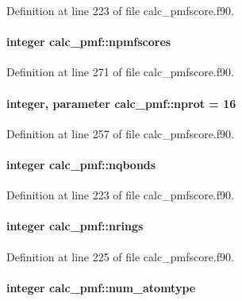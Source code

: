 Definition at line 223 of file calc\-\_\-pmfscore.\-f90.

\hypertarget{classcalc__pmf_ab503cd9dec507e951441afa3c867d4f9}{
\paragraph[{npmfscores}]{\setlength{\rightskip}{0pt plus 5cm}integer calc\-\_\-pmf\-::npmfscores}}\label{classcalc__pmf_ab503cd9dec507e951441afa3c867d4f9}


Definition at line 271 of file calc\-\_\-pmfscore.\-f90.

\hypertarget{classcalc__pmf_ad041cf7ee1dada3fb4d2be26d5894efd}{
\paragraph[{nprot}]{\setlength{\rightskip}{0pt plus 5cm}integer, parameter calc\-\_\-pmf\-::nprot = 16}}\label{classcalc__pmf_ad041cf7ee1dada3fb4d2be26d5894efd}


Definition at line 257 of file calc\-\_\-pmfscore.\-f90.

\hypertarget{classcalc__pmf_a8a8997db88056a574479b606238ae64b}{
\paragraph[{nqbonds}]{\setlength{\rightskip}{0pt plus 5cm}integer calc\-\_\-pmf\-::nqbonds}}\label{classcalc__pmf_a8a8997db88056a574479b606238ae64b}


Definition at line 223 of file calc\-\_\-pmfscore.\-f90.

\hypertarget{classcalc__pmf_a9c8caec9fe50efcc18091801d76510eb}{
\paragraph[{nrings}]{\setlength{\rightskip}{0pt plus 5cm}integer calc\-\_\-pmf\-::nrings}}\label{classcalc__pmf_a9c8caec9fe50efcc18091801d76510eb}


Definition at line 225 of file calc\-\_\-pmfscore.\-f90.

\hypertarget{classcalc__pmf_a560b5dea51180db59cce9c3106ebc977}{
\paragraph[{num\-\_\-atomtype}]{\setlength{\rightskip}{0pt plus 5cm}integer calc\-\_\-pmf\-::num\-\_\-atomtype}}\label{classcalc__pmf_a560b5dea51180db59cce9c3106ebc977}


